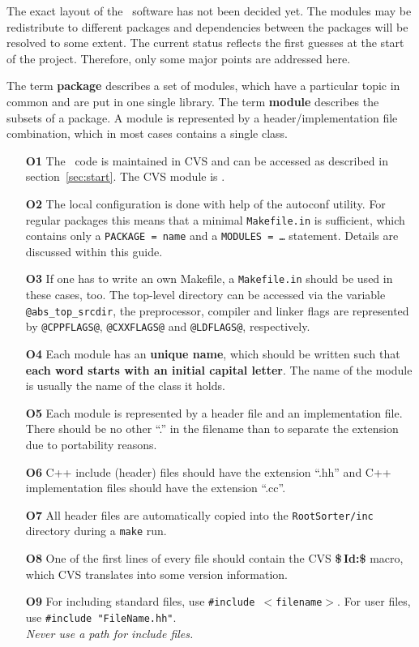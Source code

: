 The exact layout of the \rs\ software has not been decided yet. The
modules may be redistribute to different packages and dependencies
between the packages will be resolved to some extent. The current
status reflects the first guesses at the start of the project.
Therefore, only some major points are addressed here.

The term {\bf package} describes a set of modules, which have a
particular topic in common and are put in one single library.
The term {\bf module} describes the subsets of a package. A
module is represented by a header/implementation file combination,
which in most cases contains a single class. 

\begin{itemize}
\item[\bf O1] 
  The \rs\ code is maintained in CVS and can be accessed as described in 
  section~\ref{sec:start}. The CVS module is {\tt \rs}.
\item[\bf O2]
  The local configuration is done with help of the autoconf utility.
  For regular packages this means that a minimal {\tt Makefile.in}
  is sufficient, which contains only a {\tt PACKAGE = name} and a
  {\tt MODULES = \dots} statement. Details are discussed within this
  guide.
\item[\bf O3] 
  If one has to write an own Makefile, a {\tt Makefile.in} should be
  used in these cases, too. The top-level directory can be accessed
  via the variable {\tt @abs\_top\_srcdir}, the preprocessor, compiler
  and linker flags are represented by {\tt @CPPFLAGS@}, {\tt @CXXFLAGS@} 
  and {\tt @LDFLAGS@},
  respectively.
\item[\bf O4] 
  Each module has an {\bf unique name}, which should be written
  such that {\bf each word starts with an initial capital letter}. The name
  of the module is usually the name of the class it holds.
\item[\bf O5] 
  Each module is represented by a header file and an implementation 
  file. There should be no other ``.'' in the filename than to separate the
  extension due to portability reasons.
\item[\bf O6] 
  C++ include (header) files should have the extension ``.hh'' and
  C++ implementation files should have the extension ``.cc''.
\item[\bf O7]
  All header files are automatically copied into the {\tt RootSorter/inc} 
  directory during a {\tt make} run.
\item[\bf O8] 
  One of the first lines of every file should contain the CVS {\bf \$\,Id:\$}
  macro, which CVS translates into some version information.
\item[\bf O9] 
  For including standard files, use {\tt \#include $<$filename$>$}.
  For user files, use {\tt \#include "FileName.hh"}.\\
  {\em Never use a path for include files.}
\end{itemize}

